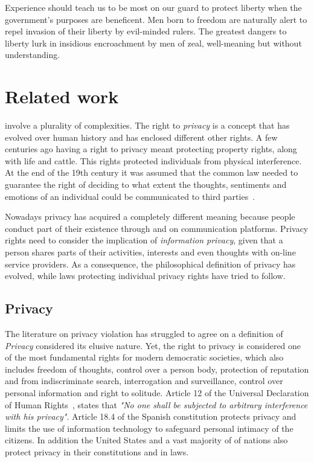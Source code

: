 \begin{savequote}[75mm] 
Experience should teach us to be most on our guard to protect liberty when the government's purposes are beneficent. Men born to freedom are naturally alert to repel invasion of their liberty by evil-minded rulers. The greatest dangers to liberty lurk in insidious encroachment by men of zeal, well-meaning but without understanding.
\end{savequote}

\chapter{Related work}

 involve a plurality of complexities. The right to \emph{privacy} is a concept that has evolved over human history and has enclosed different other rights. A few centuries ago having a right to privacy meant protecting property rights, along with life and cattle. This rights protected individuals from physical interference. At the end of the 19th century it was assumed that the common law needed to guarantee the right of deciding to what extent the thoughts, sentiments and emotions of an individual could be communicated to third parties~\cite{warren1890right}.

Nowadays privacy has acquired a completely different meaning because people conduct part of their existence through and on communication platforms. Privacy rights need to consider the implication of \emph{information privacy}, given that a person shares parts of their activities, interests and even thoughts with on-line service providers. As a consequence, the philosophical definition of privacy has evolved, while laws protecting individual privacy rights have tried to follow.

\section{Privacy}

The literature on privacy violation has struggled to agree on a definition of \emph{Privacy} considered its elusive nature. Yet, the right to privacy is considered one of the most fundamental rights for modern democratic societies, which also includes freedom of thoughts, control over a person body, protection of reputation and from indiscriminate search, interrogation and surveillance, control over personal information and right to solitude. Article 12 of the Universal Declaration of Human Rights~\cite{assembly1948universal}, states that \emph{"No one shall be subjected to arbitrary interference with his privacy"}. Article 18.4 of the Spanish constitution protects privacy and limits the use of information technology to safeguard personal intimacy of the citizens. In addition the United States and a vast majority of of nations also protect privacy in their constitutions and in laws. 

